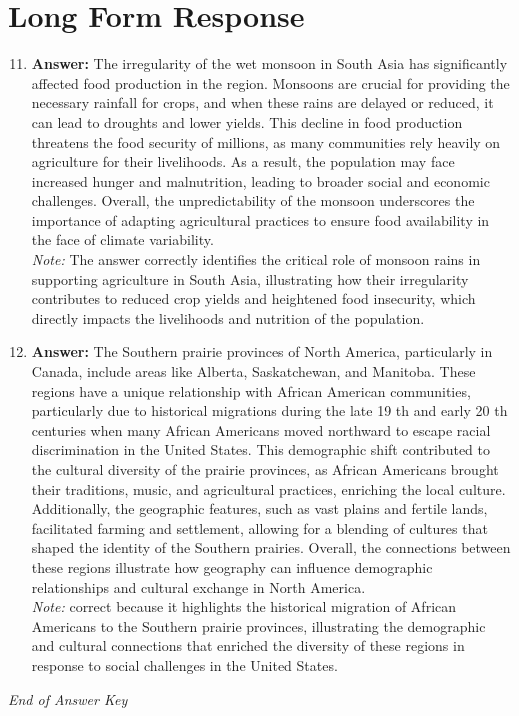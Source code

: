 \documentclass[12pt]{article}
\begin{document}
\section*{Long Form Response}
\begin{enumerate}[label=\arabic*.]
\setcounter{enumi}{10}
\item \textbf{Answer:} The irregularity of the wet monsoon in South Asia has significantly affected food production in the region. Monsoons are crucial for providing the necessary rainfall for crops, and when these rains are delayed or reduced, it can lead to droughts and lower yields. This decline in food production threatens the food security of millions, as many communities rely heavily on agriculture for their livelihoods. As a result, the population may face increased hunger and malnutrition, leading to broader social and economic challenges. Overall, the unpredictability of the monsoon underscores the importance of adapting agricultural practices to ensure food availability in the face of climate variability.
\\ \textit{Note:} The answer correctly identifies the critical role of monsoon rains in supporting agriculture in South Asia, illustrating how their irregularity contributes to reduced crop yields and heightened food insecurity, which directly impacts the livelihoods and nutrition of the population.
\item \textbf{Answer:} The Southern prairie provinces of North America, particularly in Canada, include areas like Alberta, Saskatchewan, and Manitoba. These regions have a unique relationship with African American communities, particularly due to historical migrations during the late 19 th and early 20 th centuries when many African Americans moved northward to escape racial discrimination in the United States. This demographic shift contributed to the cultural diversity of the prairie provinces, as African Americans brought their traditions, music, and agricultural practices, enriching the local culture. Additionally, the geographic features, such as vast plains and fertile lands, facilitated farming and settlement, allowing for a blending of cultures that shaped the identity of the Southern prairies. Overall, the connections between these regions illustrate how geography can influence demographic relationships and cultural exchange in North America.
\\ \textit{Note:} correct because it highlights the historical migration of African Americans to the Southern prairie provinces, illustrating the demographic and cultural connections that enriched the diversity of these regions in response to social challenges in the United States.
\end{enumerate}

\vfill
\noindent\textit{End of Answer Key}
\end{document}
